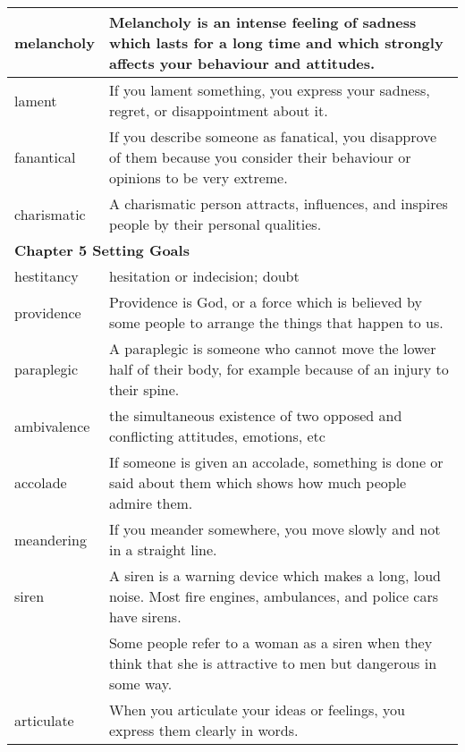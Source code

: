 \documentclass{article}
\begin{document}
\begin{center}
\begin{longtable}{|l|p{7.8cm}|}
\hline
melancholy
&
Melancholy is an intense feeling of sadness which lasts for a long time and which strongly affects your behaviour and attitudes.
\\

\hline
lament
&
If you lament something, you express your sadness, regret, or disappointment about it.
\\

\hline
fanantical
&
If you describe someone as fanatical, you disapprove of them because you consider their behaviour or opinions to be very extreme.
\\

\hline
charismatic
&
A charismatic person attracts, influences, and inspires people by their personal qualities.
\\

\hline
\multicolumn{2}{|l|}{\textbf{Chapter 5 Setting Goals}}\\
\hline
hestitancy
&
hesitation or indecision; doubt
\\

\hline
providence
&
Providence is God, or a force which is believed by some people to arrange the things that happen to us.
\\

\hline
paraplegic
&
A paraplegic is someone who cannot move the lower half of their body, for example because of an injury to their spine.
\\

\hline
ambivalence
&
the simultaneous existence of two opposed and conflicting attitudes, emotions, etc
\\

\hline
accolade
&
If someone is given an accolade, something is done or said about them which shows how much people admire them.
\\

\hline
meandering
&
If you meander somewhere, you move slowly and not in a straight line.
\\

\hline
siren
&
A siren is a warning device which makes a long, loud noise. Most fire engines, ambulances, and police cars have sirens.
\\

&
Some people refer to a woman as a siren when they think that she is attractive to men but dangerous in some way.
\\

\hline
articulate
&
When you articulate your ideas or feelings, you express them clearly in words.
\\


\end{longtable}
\end{center}
\end{document}
